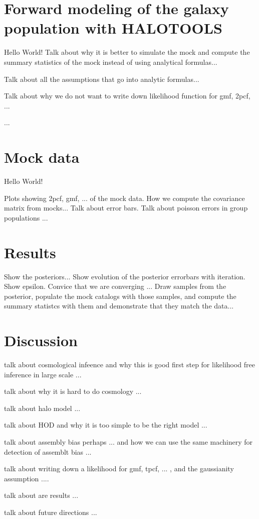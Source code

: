 \documentclass[12pt, preprint]{aastex}
\begin{document}
\section{Forward modeling of the galaxy population with HALOTOOLS}

Hello World!
Talk about why it is better to simulate the mock and compute the summary statistics of the mock instead of 
using analytical formulas...

Talk about all the assumptions that go into analytic formulas...

Talk about why we do not want to write down likelihood function for gmf, 2pcf, ...

...


\section{Mock data}

Hello World!

Plots showing 2pcf, gmf, ... of the mock data.
How we compute the covariance matrix from mocks...
Talk about error bars. Talk about poisson errors in group populations ...

\section{Results}

Show the posteriors...
Show evolution of the posterior errorbars with iteration. Show epsilon. Convice that we are converging ...
Draw samples from the posterior, populate the mock catalogs with those samples, and compute the summary statistcs with them 
and demonstrate that they match the data...

\section{Discussion}

talk about cosmological infeence and why this is good first step for likelihood free inference in large scale ...

talk about why it is hard to do cosmology ...

talk about halo model ...

talk about HOD and why it is too simple to be the right model ...

talk about assembly bias perhaps ... and how we can use the same machinery for detection of assemblt bias ... 

talk about writing down a likelihood for gmf, tpcf, ... , and the gaussianity assumption ....

talk about are results ...


talk about future directions ...

\begin{thebibliography}{70}


\end{thebibliography}
\end{document}
